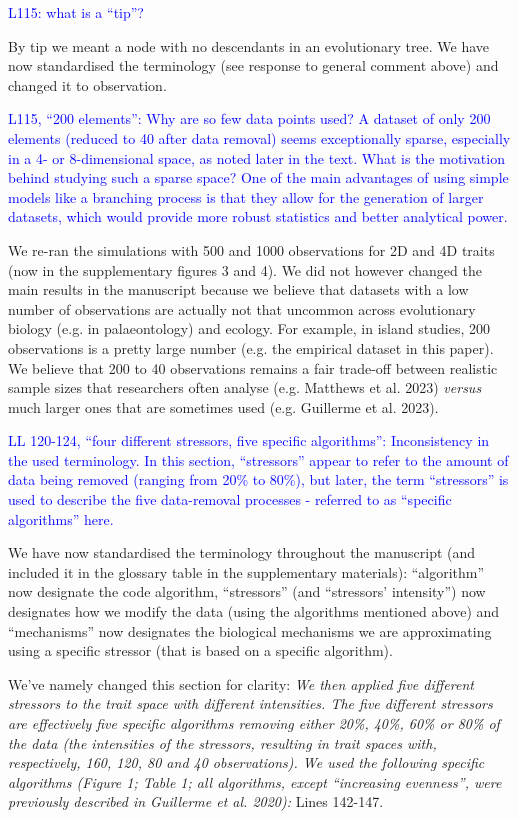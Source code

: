 \documentclass[
]{article}
\begin{document}
\textcolor{blue}{L115: what is a ``tip''?}

By tip we meant a node with no descendants in an evolutionary tree.
We have now standardised the terminology (see response to general comment above) and changed it to observation.

\textcolor{blue}{L115, ``200 elements'': Why are so few data points used? A dataset of only 200 elements (reduced to 40 after data removal) seems exceptionally sparse, especially in a 4- or 8-dimensional space, as noted later in the text.
What is the motivation behind studying such a sparse space? One of the main advantages of using simple models like a branching process is that they allow for the generation of larger datasets, which would provide more robust statistics and better analytical power.}

We re-ran the simulations with 500 and 1000 observations for 2D and 4D traits (now in the supplementary figures 3 and 4).
We did not however changed the main results in the manuscript because we believe that datasets with a low number of observations are actually not that uncommon across evolutionary biology (e.g. in palaeontology) and ecology.
For example, in island studies, 200 observations is a pretty large number (e.g. the empirical dataset in this paper).
We believe that 200 to 40 observations remains a fair trade-off between realistic sample sizes that researchers often analyse (e.g. Matthews et al. 2023) \textit{versus} much larger ones that are sometimes used (e.g. Guillerme et al. 2023).

\textcolor{blue}{LL 120-124, ``four different stressors, five specific algorithms'': Inconsistency in the used terminology.
In this section, ``stressors'' appear to refer to the amount of data being removed (ranging from 20\% to 80\%), but later, the term ``stressors'' is used to describe the five data-removal processes - referred to as ``specific algorithms'' here.}


We have now standardised the terminology throughout the manuscript (and included it in the glossary table in the supplementary materials): ``algorithm'' now designate the code algorithm, ``stressors'' (and ``stressors' intensity'') now designates how we modify the data (using the algorithms mentioned above) and ``mechanisms'' now designates the biological mechanisms we are approximating using a specific stressor (that is based on a specific algorithm).

We've namely changed this section for clarity:
\textit{We then applied five different stressors to the trait space with different intensities.
The five different stressors are effectively five specific algorithms removing either 20\%, 40\%, 60\% or 80\% of the data (the intensities of the stressors, resulting in trait spaces with, respectively, 160, 120, 80 and 40 observations).
We used the following specific algorithms (Figure 1; Table 1; all algorithms, except ``increasing evenness'', were previously described in Guillerme et al. 2020):}
Lines 142-147.
\end{document}
